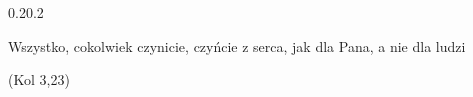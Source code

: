 \clearpage

\begin{adjustwidth}{0.2\textwidth}{0.2\textwidth}
	\begingroup
	\null\vspace{0.3\textheight}
	\Large\itshape
	\begin{center}
	Wszystko, cokolwiek czynicie, czyńcie z serca, jak dla Pana, a nie dla ludzi
	\end{center}
	\begin{flushright}
		(Kol 3,23)
	\end{flushright}
	\endgroup
\end{adjustwidth}

\clearpage